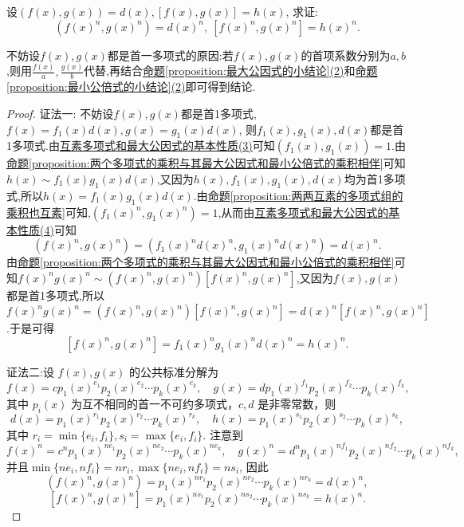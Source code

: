 \documentclass[../../main.tex]{subfiles}%
\begin{document}
\begin{proposition}[最大公因式与最小公倍式在开方下不变]\label{proposition:两个多项式的最大公因式与最小公倍式的n次方就是它们n次方的最大公因式与最小公倍式}
设\((f(x),g(x)) = d(x), [f(x),g(x)] = h(x)\), 求证:
\[
(f(x)^n,g(x)^n)=d(x)^n, \ [f(x)^n,g(x)^n]=h(x)^n.
\]
\end{proposition}
\begin{remark}
不妨设\(f(x),g(x)\)都是首一多项式的原因:若$f(x),g(x)$的首项系数分别为$a,b$,则用$\frac{f(x)}{a},\frac{g(x)}{b}$代替,再结合\hyperref[proposition:最大公因式的小结论]{命题\ref{proposition:最大公因式的小结论}(2)}和\hyperref[proposition:最小公倍式的小结论]{命题\ref{proposition:最小公倍式的小结论}(2)}即可得到结论.
\end{remark}
\begin{proof}

{\color{blue}证法一:}
不妨设\(f(x),g(x)\)都是首1多项式, \(f(x)=f_1(x)d(x), g(x)=g_1(x)d(x)\), 则$f_1(x),g_1(x),d(x)$都是首1多项式.由\hyperref[proposition:互素多项式和最大公因式的基本性质]{互素多项式和最大公因式的基本性质(3)}可知\((f_1(x),g_1(x)) = 1\).由\hyperref[proposition:两个多项式的乘积与其最大公因式和最小公倍式的乘积相伴]{命题\ref{proposition:两个多项式的乘积与其最大公因式和最小公倍式的乘积相伴}}可知\(h(x)\sim f_1(x)g_1(x)d(x)\),又因为$h(x),f_1(x),g_1(x),d(x)$均为首1多项式,所以\(h(x)=f_1(x)g_1(x)d(x)\).由\hyperref[proposition:两两互素的多项式组的乘积也互素]{命题\ref{proposition:两两互素的多项式组的乘积也互素}}可知,\((f_1(x)^n,g_1(x)^n)=1\),从而由\hyperref[proposition:互素多项式和最大公因式的基本性质]{互素多项式和最大公因式的基本性质(4)}可知
\[
(f(x)^n,g(x)^n)=(f_1(x)^nd(x)^n,g_1(x)^nd(x)^n)=d(x)^n.
\]
由\hyperref[proposition:两个多项式的乘积与其最大公因式和最小公倍式的乘积相伴]{命题\ref{proposition:两个多项式的乘积与其最大公因式和最小公倍式的乘积相伴}}可知\(f(x)^ng(x)^n\sim (f(x)^n,g(x)^n)[f(x)^n,g(x)^n]\),又因为$f(x),g(x)$都是首1多项式,所以\(f(x)^ng(x)^n=(f(x)^n,g(x)^n)[f(x)^n,g(x)^n]=d(x)^n[f(x)^n,g(x)^n]\).于是可得
\[
[f(x)^n,g(x)^n]=f_1(x)^ng_1(x)^nd(x)^n=h(x)^n.
\]

{\color{blue}证法二:}设 \(f(x), g(x)\) 的公共标准分解为
\[
f(x) = cp_1(x)^{e_1}p_2(x)^{e_2} \cdots p_k(x)^{e_k}, \quad g(x) = dp_1(x)^{f_1}p_2(x)^{f_2} \cdots p_k(x)^{f_k},
\]
其中 \(p_i(x)\) 为互不相同的首一不可约多项式，\(c, d\) 是非零常数，则
\[
d(x) = p_1(x)^{r_1}p_2(x)^{r_2} \cdots p_k(x)^{r_k}, \quad h(x) = p_1(x)^{s_1}p_2(x)^{s_2} \cdots p_k(x)^{s_k},
\]
其中 \(r_i = \min\{e_i, f_i\}, s_i = \max\{e_i, f_i\}\). 注意到
\[
f(x)^n = c^n p_1(x)^{ne_1}p_2(x)^{ne_2} \cdots p_k(x)^{ne_k}, \quad g(x)^n = d^n p_1(x)^{nf_1}p_2(x)^{nf_2} \cdots p_k(x)^{nf_k},
\]
并且\(\min\{ne_i, nf_i\} = nr_i, \max\{ne_i, nf_i\} = ns_i\), 因此
\[
(f(x)^n, g(x)^n) = p_1(x)^{nr_1}p_2(x)^{nr_2} \cdots p_k(x)^{nr_k} = d(x)^n,
\]
\[
[f(x)^n, g(x)^n] = p_1(x)^{ns_1}p_2(x)^{ns_2} \cdots p_k(x)^{ns_k} = h(x)^n.
\]
\end{proof}
\end{document}
